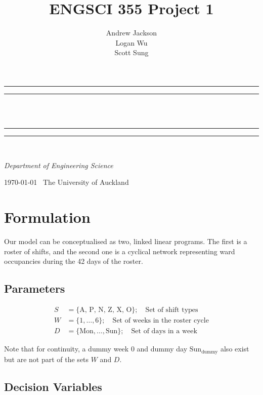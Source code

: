 \documentclass[a4paper]{article}
\title{ENGSCI 355 Project 1}
\author{Andrew Jackson\\Logan Wu\\Scott Sung}
\newlength{\drop}
\begin{document}
\begin{titlepage}
    \textheight
    \centering
    \vspace*{\baselineskip}
    \rule{\textwidth}{1.6pt}\vspace*{-\baselineskip}\vspace*{2pt}
    \rule{\textwidth}{0.4pt}\\[\baselineskip]
    {\LARGE \@title}\\[0.2\baselineskip]
    \rule{\textwidth}{0.4pt}\vspace*{-\baselineskip}\vspace{3.2pt}
    \rule{\textwidth}{1.6pt}\\[\baselineskip]
    \vspace*{2\baselineskip}
    {\Large \textsc{\@author}\par}
    {\itshape Department of Engineering Science\par}
    \vspace*{2\baselineskip}
    {\scshape \today} \        {\large The University of Auckland}\par
\end{titlepage}
\makeatother
\pagestyle{fancy}

\section{Formulation}

Our model can be conceptualised as two, linked linear programs. The first is a roster of shifts, and the second one is a cyclical network representing ward occupancies during the 42 days of the roster.

\subsection{Parameters}

\begin{align*}
S &= \{\text{A, P, N, Z, X, O}\}; \quad\text{Set of shift types}\\
W &= \{1, \dots, 6\}; \quad\text{Set of weeks in the roster cycle}\\
D &= \{\text{Mon},\dots,\text{Sun}\}; \quad\text{Set of days in a week}
\end{align*}

Note that for continuity, a dummy week $0$ and dummy day $\text{Sun}_\text{dummy}$ also exist but are not part of the sets $W$ and $D$.

\subsection{Decision Variables}
\end{document}
